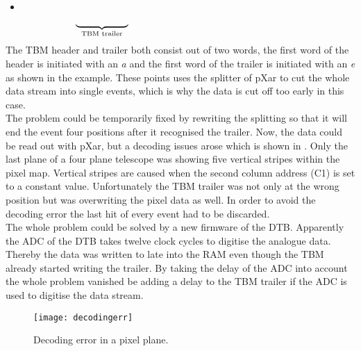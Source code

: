 \vspace*{-1.0cm}
\begin{itemize}
 \item[] \terminal{$\hdots$ 0fd4 e000 c001 0077 0044 409e]} 
\end{itemize}
\vspace*{-0.5cm}
\begin{equation*}
	\underbrace{\hspace*{1.9cm}}_{\z{TBM trailer}}\hspace*{5.7cm}
\end{equation*}
The \ac{TBM} header and trailer both consist out of two words, the first word of the header is initiated with an \textit{a} and the first word of the trailer is initiated with an \textit{e} as shown in the example. These points uses the splitter of pXar to cut the whole data stream into single events, which is why the data is cut off too early in this case.\\
The problem could be temporarily fixed by rewriting the splitting so that it will end the event four positions after it recognised the trailer. Now, the data could be read out with pXar, but a decoding issues arose which is shown in . Only the last plane of a four plane telescope was showing five vertical stripes within the pixel map. Vertical stripes are caused when the second column address (C1) is set to a constant value. Unfortunately the \ac{TBM} trailer was not only at the wrong position but was overwriting the pixel data as well. In order to avoid the decoding error the last hit of every event had to be discarded.\\
The whole problem could be solved by a new firmware of the \ac{DTB}. Apparently the \ac{ADC} of the \ac{DTB} takes twelve clock cycles to digitise the analogue data. Thereby the data was written to late into the \ac{RAM} even though the \ac{TBM} already started writing the trailer. By taking the delay of the \ac{ADC} into account the whole problem vanished be adding a delay to the \ac{TBM} trailer if the \ac{ADC} is used to digitise the data stream.
\begin{figure}[ht]
	\centering
	\texttt{[image: decodingerr]}
	\caption{Decoding error in a pixel plane.}
	\label{pdecerr}
\end{figure}\no
